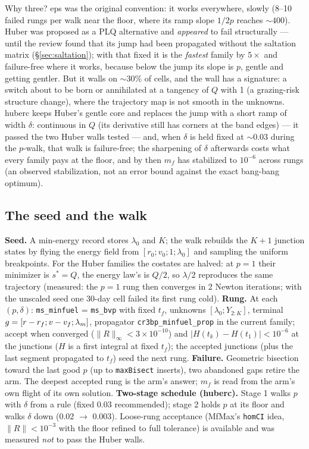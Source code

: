\documentclass[11pt]{article}
\newcommand{\tf}{t_f}\newcommand{\R}{\mathbb{R}}
\newcommand{\file}[1]{\texttt{#1}}
\begin{document}
\begin{intu}
Why three? eps was the original convention: it works everywhere, slowly
(8--10 failed rungs per walk near the floor, where its ramp slope $1/2p$ reaches
$\sim400$). Huber was proposed as a PLQ alternative and \emph{appeared} to fail
structurally --- until the review found that its jump had been propagated
without the saltation matrix (\S\ref{sec:saltation}); with that fixed it is the
\emph{fastest} family by $5\times$ and failure-free where it works, because
below the jump its slope is $p$, gentle and getting gentler. But it walls on
$\sim30\%$ of cells, and the wall has a signature: a switch about to be born or
annihilated at a tangency of $Q$ with 1 (a grazing-risk structure change), where
the trajectory map is not smooth in the unknowns. huberc keeps Huber's gentle
core and replaces the jump with a short ramp of width $\delta$: continuous in $Q$ (its derivative still has corners at the band edges) --- it passed the two Huber walls tested --- and, when
$\delta$ is held fixed at $\sim0.03$ during the $p$-walk, that walk is
failure-free; the sharpening of $\delta$ afterwards costs what every family pays
at the floor, and by then $m_f$ has stabilized to $10^{-6}$ across rungs (an observed stabilization, not an error bound against the exact bang-bang optimum).
\end{intu}

\subsection{The seed and the walk}\label{sec:seed}
\begin{rig}
\textbf{Seed.} A min-energy record stores $\lambda_0$ and $K$; the walk rebuilds
the $K{+}1$ junction states by flying the energy field from $[r_0;v_0;1;\lambda_0]$
and sampling the uniform breakpoints. For the Huber families the costates are
halved: at $p=1$ their minimizer is $s^*=Q$, the energy law's is $Q/2$, so
$\lambda/2$ reproduces the same trajectory (measured: the $p=1$ rung then
converges in 2 Newton iterations; with the unscaled seed one 30-day cell failed
its first rung cold).
\textbf{Rung.} At each $(p,\delta)$: \file{ms\_minfuel} = \file{ms\_bvp} with
fixed $\tf$, unknowns $[\lambda_0;Y_{2:K}]$, terminal $g=[r-r_f;v-v_f;\lambda_m]$,
propagator \file{cr3bp\_minfuel\_prop} in the current family; accept when
converged ($\|R\|_\infty<3\times10^{-10}$) and $|H(t_k)-H(t_1)|<10^{-6}$ at the
junctions ($H$ is a first integral at fixed $\tf$); the accepted junctions
(plus the last segment propagated to $\tf$) seed the next rung.
\textbf{Failure.} Geometric bisection toward the last good $p$ (up to
\texttt{maxBisect} inserts), two abandoned gaps retire the arm. The deepest
accepted rung is the arm's answer; $m_f$ is read from the arm's own flight of
its own solution.
\textbf{Two-stage schedule (huberc).} Stage 1 walks $p$ with $\delta$ from a
rule (fixed 0.03 recommended); stage 2 holds $p$ at its floor and walks $\delta$
down (0.02 $\to$ 0.003). Loose-rung acceptance (MfMax's \texttt{homCI} idea,
$\|R\|<10^{-3}$ with the floor refined to full tolerance) is available and was
measured \emph{not} to pass the Huber walls.
\end{rig}
\end{document}
